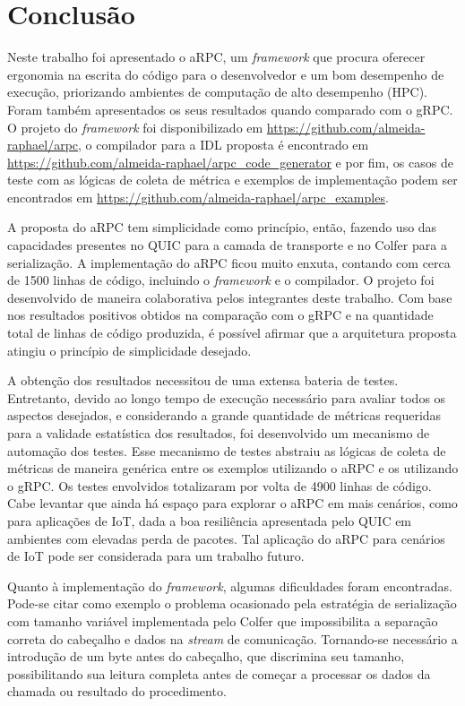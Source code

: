 \chapter{Conclusão}
\label{chp:capitulo5}

Neste trabalho foi apresentado o aRPC, um \textit{framework} que procura oferecer ergonomia na escrita do código para o desenvolvedor e um bom desempenho de execução, priorizando ambientes de computação de alto desempenho (HPC). Foram também apresentados os seus resultados quando comparado com o gRPC. O projeto do \textit{framework} foi disponibilizado em \url{https://github.com/almeida-raphael/arpc}, o compilador para a IDL proposta é encontrado em \url{https://github.com/almeida-raphael/arpc_code_generator} e por fim, os casos de teste com as lógicas de coleta de métrica e exemplos de implementação podem ser encontrados em \url{https://github.com/almeida-raphael/arpc_examples}.

A proposta do aRPC tem simplicidade como princípio, então, fazendo uso das capacidades presentes no QUIC para a camada de transporte e no Colfer para a serialização. A implementação do aRPC ficou muito enxuta, contando com cerca de 1500 linhas de código, incluindo o \textit{framework} e o compilador. O projeto foi desenvolvido de maneira colaborativa pelos integrantes deste trabalho. Com base nos resultados positivos obtidos na comparação com o gRPC e na quantidade total de linhas de código produzida, é possível afirmar que a arquitetura proposta atingiu o princípio de simplicidade desejado.

A obtenção dos resultados necessitou de uma extensa bateria de testes. Entretanto, devido ao longo tempo de execução necessário para avaliar todos os aspectos desejados, e considerando a grande quantidade de métricas requeridas para a validade estatística dos resultados, foi desenvolvido um mecanismo de automação dos testes. Esse mecanismo de testes abstraiu as lógicas de coleta de métricas de maneira genérica entre os exemplos utilizando o aRPC e os utilizando o gRPC. Os testes envolvidos totalizaram por volta de 4900 linhas de código. Cabe levantar que ainda há espaço para explorar o aRPC em mais cenários, como para aplicações de IoT, dada a boa resiliência apresentada pelo QUIC em ambientes com elevadas perda de pacotes. Tal aplicação do aRPC para cenários de IoT pode ser considerada para um trabalho futuro.

Quanto à implementação do \textit{framework}, algumas dificuldades foram encontradas. Pode-se citar como exemplo o problema ocasionado pela estratégia de serialização com tamanho variável implementada pelo Colfer que impossibilita a separação correta do cabeçalho e dados na \textit{stream} de comunicação. Tornando-se necessário a introdução de um byte antes do cabeçalho, que discrimina seu tamanho, possibilitando sua leitura completa antes de começar a processar os dados da chamada ou resultado do procedimento.

